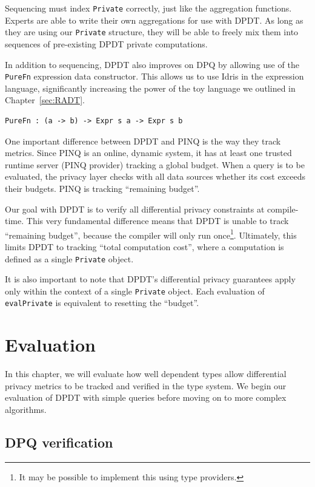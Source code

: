 \documentclass[12pt]{report}
\begin{document}
Sequencing must index \texttt{Private} correctly, just like the aggregation functions.
Experts are able to write their own aggregations for use with DPDT.
As long as they are using our \texttt{Private} structure, they will be able to freely mix them into sequences of pre-existing DPDT private computations.

In addition to sequencing, DPDT also improves on DPQ by allowing use of the \texttt{PureFn} expression data constructor.
This allows us to use Idris in the expression language, significantly increasing the power of the toy language we outlined in Chapter~\ref{sec:RADT}.

\begin{lstlisting}[float,caption={PureFn expression constructor}, label={lst:purefn}]
PureFn : (a -> b) -> Expr s a -> Expr s b
\end{lstlisting}

One important difference between DPDT and PINQ is the way they track metrics.
Since PINQ is an online, dynamic system, it has at least one trusted runtime server (PINQ provider) tracking a global budget.
When a query is to be evaluated, the privacy layer checks with all data sources whether its cost exceeds their budgets.
PINQ is tracking ``remaining budget''.

Our goal with DPDT is to verify all differential privacy constraints at compile-time.
This very fundamental difference means that DPDT is unable to track ``remaining budget'', because the compiler will only run once\footnote{It may be possible to implement this using type providers.}.
Ultimately, this limits DPDT to tracking ``total computation cost'', where a computation is defined as a single \texttt{Private} object.

It is also important to note that DPDT's differential privacy guarantees apply only within the context of a single \texttt{Private} object.
Each evaluation of \texttt{evalPrivate} is equivalent to resetting the ``budget''.

\chapter{Evaluation}\label{sec:evaluation}

In this chapter, we will evaluate how well dependent types allow differential privacy metrics to be tracked and verified in the type system.
We begin our evaluation of DPDT with simple queries before moving on to more complex algorithms.

\section{DPQ verification}
\end{document}
